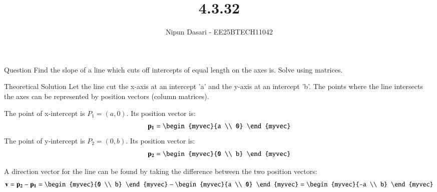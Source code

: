 \documentclass{beamer}
\title %
{4.3.32}
\author %
{Nipun Dasari - EE25BTECH11042}
\begin{document}
	
	\frame{\titlepage}
	\begin{frame}{Question}
		Find the slope of a line which cuts off intercepts of equal length on the axes is. Solve using matrices. \\
	\end{frame}
	
	
	\begin{frame}{Theoretical Solution}
	Let the line cut the x-axis at an intercept 'a' and the y-axis at an intercept 'b'. The points where the line intersects the axes can be represented by position vectors (column matrices).
	
	The point of x-intercept is $P_1 = (a, 0)$. Its position vector is:
	\begin{align}
		\vec{p_1} = \begin{myvec}{a \\ 0} \end{myvec}
	\end{align}
	The point of y-intercept is $P_2 = (0, b)$. Its position vector is:
	\begin{align}
		\vec{p_2} = \begin{myvec}{0 \\ b} \end{myvec}
	\end{align}
	
	A direction vector for the line can be found by taking the difference between the two position vectors:
	\begin{align}
		\vec{v} = \vec{p_2} - \vec{p_1} = \begin{myvec}{0 \\ b} \end{myvec} - \begin{myvec}{a \\ 0} \end{myvec} = \begin{myvec}{-a \\ b} \end{myvec} \label{eq:dir_vec}
	\end{align}
	\end{frame}
\end{document}
